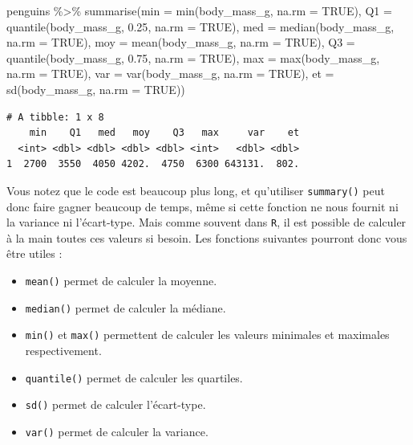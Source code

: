 \documentclass[
  a4paper,
  DIV=11,
  numbers=noendperiod,
  oneside]{scrreprt}
\newenvironment{Shaded}{}{}
\newcommand{\AttributeTok}[1]{\textcolor[rgb]{0.84,0.23,0.29}{#1}}
\newcommand{\ConstantTok}[1]{\textcolor[rgb]{0.00,0.36,0.77}{#1}}
\newcommand{\FloatTok}[1]{\textcolor[rgb]{0.00,0.36,0.77}{#1}}
\newcommand{\FunctionTok}[1]{\textcolor[rgb]{0.44,0.26,0.76}{#1}}
\newcommand{\NormalTok}[1]{\textcolor[rgb]{0.14,0.16,0.18}{#1}}
\newcommand{\SpecialCharTok}[1]{\textcolor[rgb]{0.00,0.36,0.77}{#1}}
\providecommand{\tightlist}{%
  \setlength{\itemsep}{0pt}\setlength{\parskip}{0pt}}\usepackage{longtable,booktabs,array}
\begin{document}
\begin{Shaded}
\begin{Highlighting}[]
\NormalTok{penguins }\SpecialCharTok{\%\textgreater{}\%} 
  \FunctionTok{summarise}\NormalTok{(}\AttributeTok{min =} \FunctionTok{min}\NormalTok{(body\_mass\_g, }\AttributeTok{na.rm =} \ConstantTok{TRUE}\NormalTok{),}
            \AttributeTok{Q1 =} \FunctionTok{quantile}\NormalTok{(body\_mass\_g, }\FloatTok{0.25}\NormalTok{, }\AttributeTok{na.rm =} \ConstantTok{TRUE}\NormalTok{),}
            \AttributeTok{med =} \FunctionTok{median}\NormalTok{(body\_mass\_g, }\AttributeTok{na.rm =} \ConstantTok{TRUE}\NormalTok{),}
            \AttributeTok{moy =} \FunctionTok{mean}\NormalTok{(body\_mass\_g, }\AttributeTok{na.rm =} \ConstantTok{TRUE}\NormalTok{),}
            \AttributeTok{Q3 =} \FunctionTok{quantile}\NormalTok{(body\_mass\_g, }\FloatTok{0.75}\NormalTok{, }\AttributeTok{na.rm =} \ConstantTok{TRUE}\NormalTok{),}
            \AttributeTok{max =} \FunctionTok{max}\NormalTok{(body\_mass\_g, }\AttributeTok{na.rm =} \ConstantTok{TRUE}\NormalTok{),}
            \AttributeTok{var =} \FunctionTok{var}\NormalTok{(body\_mass\_g, }\AttributeTok{na.rm =} \ConstantTok{TRUE}\NormalTok{),}
            \AttributeTok{et =} \FunctionTok{sd}\NormalTok{(body\_mass\_g, }\AttributeTok{na.rm =} \ConstantTok{TRUE}\NormalTok{))}
\end{Highlighting}
\end{Shaded}

\begin{verbatim}
# A tibble: 1 x 8
    min    Q1   med   moy    Q3   max     var    et
  <int> <dbl> <dbl> <dbl> <dbl> <int>   <dbl> <dbl>
1  2700  3550  4050 4202.  4750  6300 643131.  802.
\end{verbatim}

Vous notez que le code est beaucoup plus long, et qu'utiliser
\texttt{summary()} peut donc faire gagner beaucoup de temps, même si
cette fonction ne nous fournit ni la variance ni l'écart-type. Mais
comme souvent dans \texttt{R}, il est possible de calculer à la main
toutes ces valeurs si besoin. Les fonctions suivantes pourront donc vous
être utiles :

\begin{itemize}
\tightlist
\item
  \texttt{mean()} permet de calculer la moyenne.
\item
  \texttt{median()} permet de calculer la médiane.
\item
  \texttt{min()} et \texttt{max()} permettent de calculer les valeurs
  minimales et maximales respectivement.
\item
  \texttt{quantile()} permet de calculer les quartiles.
\item
  \texttt{sd()} permet de calculer l'écart-type.
\item
  \texttt{var()} permet de calculer la variance.
\end{itemize}
\end{document}
